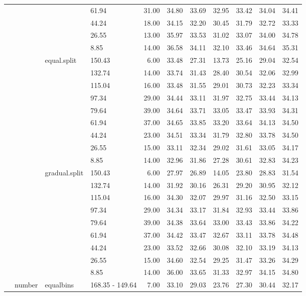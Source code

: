\begin{longtable}{llllrrrrrrr}
   &  &  & 61.94 & 31.00 & 34.80 & 33.69 & 32.95 & 33.42 & 34.04 & 34.41 \\ 
   &  &  & 44.24 & 18.00 & 34.15 & 32.20 & 30.45 & 31.79 & 32.72 & 33.33 \\ 
   &  &  & 26.55 & 13.00 & 35.97 & 33.53 & 31.02 & 33.07 & 34.00 & 34.78 \\ 
   &  &  & 8.85 & 14.00 & 36.58 & 34.11 & 32.10 & 33.46 & 34.64 & 35.31 \\ 
   &  & equal.split & 150.43 & 6.00 & 33.48 & 27.31 & 13.73 & 25.16 & 29.04 & 32.54 \\ 
   &  &  & 132.74 & 14.00 & 33.74 & 31.43 & 28.40 & 30.54 & 32.06 & 32.99 \\ 
   &  &  & 115.04 & 16.00 & 33.48 & 31.55 & 29.01 & 30.73 & 32.23 & 33.34 \\ 
   &  &  & 97.34 & 29.00 & 34.44 & 33.11 & 31.97 & 32.75 & 33.44 & 34.13 \\ 
   &  &  & 79.64 & 39.00 & 34.64 & 33.71 & 33.05 & 33.47 & 33.93 & 34.31 \\ 
   &  &  & 61.94 & 37.00 & 34.65 & 33.85 & 33.20 & 33.64 & 34.13 & 34.50 \\ 
   &  &  & 44.24 & 23.00 & 34.51 & 33.34 & 31.79 & 32.80 & 33.78 & 34.50 \\ 
   &  &  & 26.55 & 15.00 & 33.11 & 32.34 & 29.02 & 31.61 & 33.05 & 34.17 \\ 
   &  &  & 8.85 & 14.00 & 32.96 & 31.86 & 27.28 & 30.61 & 32.83 & 34.23 \\ 
   &  & gradual.split & 150.43 & 6.00 & 27.97 & 26.89 & 14.05 & 23.80 & 28.83 & 31.54 \\ 
   &  &  & 132.74 & 14.00 & 31.92 & 30.16 & 26.31 & 29.20 & 30.95 & 32.12 \\ 
   &  &  & 115.04 & 16.00 & 34.30 & 32.07 & 29.97 & 31.16 & 32.50 & 33.15 \\ 
   &  &  & 97.34 & 29.00 & 34.34 & 33.17 & 31.84 & 32.93 & 33.44 & 33.86 \\ 
   &  &  & 79.64 & 39.00 & 34.38 & 33.64 & 33.00 & 33.43 & 33.86 & 34.22 \\ 
   &  &  & 61.94 & 37.00 & 34.42 & 33.47 & 32.67 & 33.11 & 33.78 & 34.48 \\ 
   &  &  & 44.24 & 23.00 & 33.52 & 32.66 & 30.08 & 32.10 & 33.19 & 34.13 \\ 
   &  &  & 26.55 & 15.00 & 34.60 & 32.54 & 29.25 & 31.47 & 33.26 & 34.29 \\ 
   &  &  & 8.85 & 14.00 & 36.00 & 33.65 & 31.33 & 32.97 & 34.15 & 34.80 \\ 
   & number & equalbins & 168.35 - 149.64 & 7.00 & 33.10 & 29.03 & 23.76 & 27.30 & 30.44 & 32.17 \\ 

\end{longtable}
